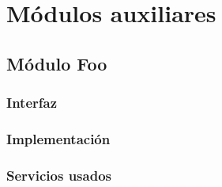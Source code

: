 \section{Módulos auxiliares}
\subsection{Módulo Foo}
\subsubsection{Interfaz}
\subsubsection{Implementación}
\subsubsection{Servicios usados}




